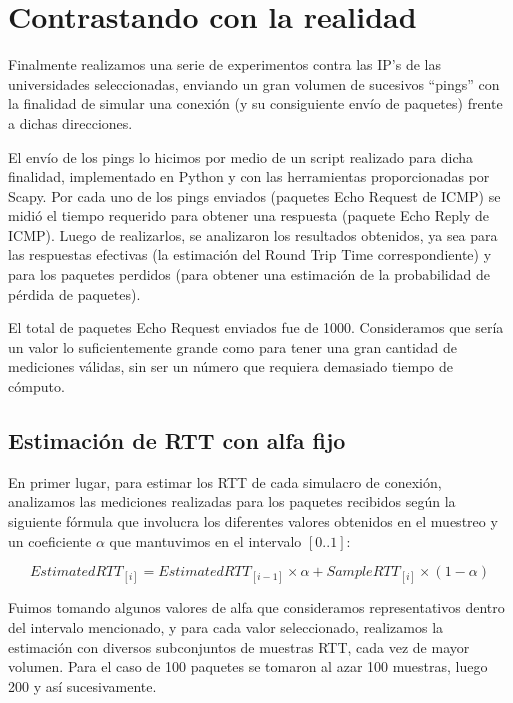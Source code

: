 \section{Contrastando con la realidad}

Finalmente realizamos una serie de experimentos contra las IP's de las universidades seleccionadas, enviando un gran volumen de sucesivos ``pings'' con la finalidad de simular una conexión (y su consiguiente envío de paquetes) frente a dichas direcciones.

El envío de los pings lo hicimos por medio de un script realizado para dicha finalidad, implementado en Python y con las herramientas proporcionadas por Scapy. Por cada uno de los pings enviados (paquetes Echo Request de ICMP) se midió el tiempo requerido para obtener una respuesta (paquete Echo Reply de ICMP). Luego de realizarlos, se analizaron los resultados obtenidos, ya sea para las respuestas efectivas (la estimación del Round Trip Time correspondiente) y para los paquetes perdidos (para obtener una estimación de la probabilidad de pérdida de paquetes). 

El total de paquetes Echo Request enviados fue de 1000. Consideramos que sería un valor lo suficientemente grande como para tener una gran cantidad de mediciones válidas, sin ser un número que requiera demasiado tiempo de cómputo.

\subsection{Estimación de RTT con alfa fijo}

En primer lugar, para estimar los RTT de cada simulacro de conexión, analizamos las mediciones realizadas para los paquetes recibidos según la siguiente fórmula que involucra los diferentes valores obtenidos en el muestreo y un coeficiente $\alpha$ que mantuvimos en el intervalo $[0..1]$:

\begin{equation}
EstimatedRTT_{[i]} = EstimatedRTT_{[i - 1]} \times \alpha + SampleRTT_{[i]} \times (1 - \alpha)
\end{equation}

Fuimos tomando algunos valores de alfa que consideramos representativos dentro del intervalo mencionado, y para cada valor seleccionado, realizamos la estimación con diversos subconjuntos de muestras RTT, cada vez de mayor volumen. Para el caso de 100 paquetes se tomaron al azar 100 muestras, luego 200 y así sucesivamente.

